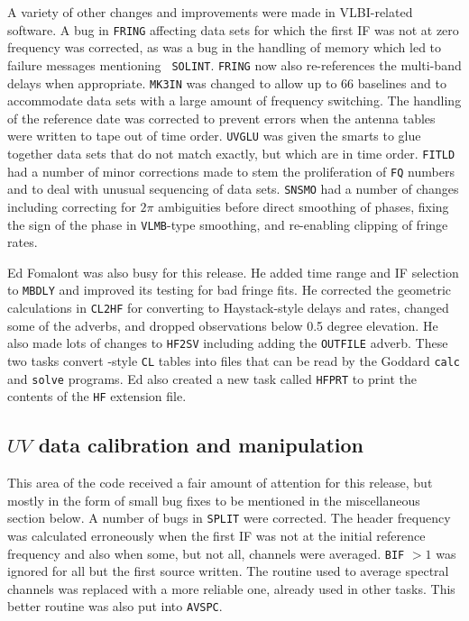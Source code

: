 A variety of other changes and improvements were made in VLBI-related
software.  A bug in {\tt FRING} affecting data sets for which the
first IF was not at zero frequency was corrected, as was a bug in the
handling of memory which led to failure messages mentioning \hbox{{\tt
SOLINT}}.  {\tt FRING} now also re-references the multi-band delays
when appropriate.  {\tt MK3IN} was changed to allow up to 66 baselines
and to accommodate data sets with a large amount of frequency
switching.  The handling of the reference date was corrected to
prevent errors when the antenna tables were written to tape out of time
order.  {\tt UVGLU} was given the smarts to glue together data sets
that do not match exactly, but which are in time order.  {\tt FITLD}
had a number of minor corrections made to stem the proliferation of
{\tt FQ} numbers and to deal with unusual sequencing of data sets.
{\tt SNSMO} had a number of changes including correcting for $2\pi$
ambiguities before direct smoothing of phases, fixing the sign of the
phase in {\tt VLMB}-type smoothing, and re-enabling clipping of fringe
rates.

Ed Fomalont was also busy for this release.  He added time range and
IF selection to {\tt MBDLY} and improved its testing for bad fringe
fits.  He corrected the geometric calculations in {\tt CL2HF} for
converting to Haystack-style delays and rates, changed some of the
adverbs, and dropped observations below 0.5 degree elevation.  He also
made lots of changes to {\tt HF2SV} including adding the {\tt OUTFILE}
adverb.  These two tasks convert \AIPS-style {\tt CL} tables into
files that can be read by the Goddard {\tt calc} and {\tt solve}
programs.  Ed also created a new task called {\tt HFPRT} to print the
contents of the {\tt HF} extension file.

\subsection{$UV$ data calibration and manipulation}

This area of the code received a fair amount of attention for this
release, but mostly in the form of small bug fixes to be mentioned in
the miscellaneous section below.  A number of bugs in {\tt SPLIT}
were corrected.  The header frequency was calculated erroneously when
the first IF was not at the initial reference frequency and also when
some, but not all, channels were averaged.  {\tt BIF} $> 1$ was
ignored for all but the first source written.  The routine used to
average spectral channels was replaced with a more reliable one,
already used in other tasks.  This better routine was also put into
\hbox{{\tt AVSPC}}.


